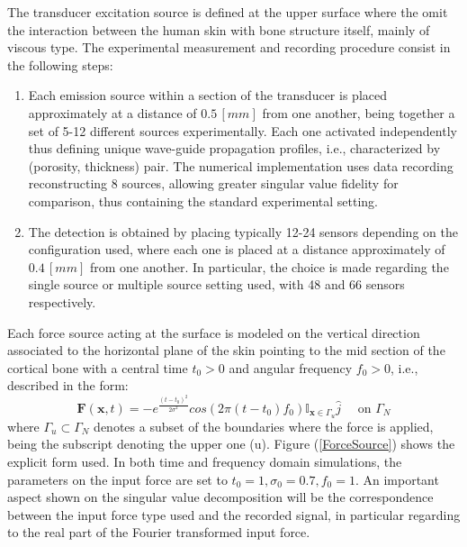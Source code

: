 The transducer excitation source is defined at the upper surface where the omit the interaction between the human skin with bone structure itself, mainly of viscous type.
The experimental measurement and recording procedure consist in the following steps:
\begin{enumerate}
    \item Each emission source within a section of the transducer is placed approximately at a distance of $0.5 \, [mm]$ from one another, being together a set of 5-12 different sources experimentally. Each one activated independently thus defining unique wave-guide propagation profiles, i.e., characterized by (porosity, thickness) pair. The numerical implementation uses data recording reconstructing 8 sources, allowing greater singular value fidelity for comparison, thus containing the standard experimental setting.
    
    \item The detection is obtained by placing typically 12-24 sensors depending on the configuration used, where each one is placed at a distance approximately of $0.4 \, [mm]$ from one another. In particular, the choice is made regarding the single source or multiple source setting used, with 48 and 66 sensors respectively.
\end{enumerate}
Each force source acting at the surface is modeled on the vertical direction associated to the horizontal plane of the skin pointing to the mid section of the cortical bone with a central time $t_0 > 0$ and angular frequency $f_0 > 0$, i.e., described in the form:
\begin{equation}
    \label{Force-eq}
    \mathbf{F}(\mathbf{x},t) = - e^{\frac{(t-t_0)^2}{2\sigma^2}} cos( 2 \pi (t-t_0) f_0 ) \mathbb{I}_{\mathbf{x} \in \Gamma_u} \hat{j} \quad \text{ on } \Gamma_N
\end{equation}
where $\Gamma_u \subset \Gamma_N$ denotes a subset of the boundaries where the force is applied, being the subscript denoting the upper one (u). Figure (\ref{ForceSource}) shows the explicit form used. In both time and frequency domain simulations, the parameters on the input force are set to $t_0 = 1, \sigma_0 = 0.7, f_0 = 1$. An important aspect shown on the singular value decomposition will be the correspondence between the input force type used and the recorded signal, in particular regarding to the real part of the Fourier transformed input force.

